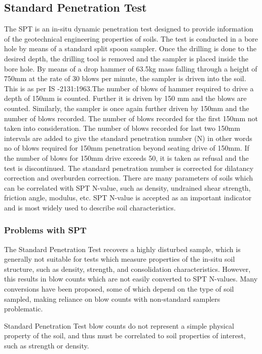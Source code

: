 \subsection{Standard Penetration Test}
The SPT is an in-situ dynamic penetration test designed to provide information of the geotechnical engineering properties of soils. The test is conducted in a bore hole by means of a standard split spoon sampler. Once the drilling is done to the desired depth, the drilling tool is removed and the sampler is placed inside the bore hole. By means of a drop hammer of 63.5kg mass falling through a height of 750mm at the rate of 30 blows per minute, the sampler is driven into the soil. This is as per IS -2131:1963.The number of blows of hammer required to drive a depth of 150mm is counted. Further it is driven by 150 mm and the blows are counted. Similarly, the sampler is once again further driven by 150mm and the number of blows recorded. The number of blows recorded for the first 150mm not taken into consideration. The number of blows recorded for last two 150mm intervals are added to give the standard penetration number (N) in other words no of blows required for 150mm penetration beyond seating drive of 150mm. If the number of blows for 150mm drive exceeds 50, it is taken as refusal and the test is discontinued. The standard penetration number is corrected for dilatancy correction and overburden correction. There are many parameters of soils which can be correlated with SPT N-value, such as density, undrained shear strength, friction angle, modulus, etc. SPT N-value is accepted as an important indicator and is most widely used to describe soil characteristics.\cite{mahoto_bearing_2012}
\subsubsection{Problems with SPT}
The Standard Penetration Test recovers a highly disturbed sample, which is generally not suitable for tests which measure properties of the in-situ soil structure, such as density, strength, and consolidation characteristics. However, this results in blow counts which are not easily converted to SPT N-values.  Many conversions have been proposed, some of which depend on the type of soil sampled, making reliance on blow counts with non-standard samplers problematic.
\par
Standard Penetration Test blow counts do not represent a simple physical property of the soil, and thus must be correlated to soil properties of interest, such as strength or density.

